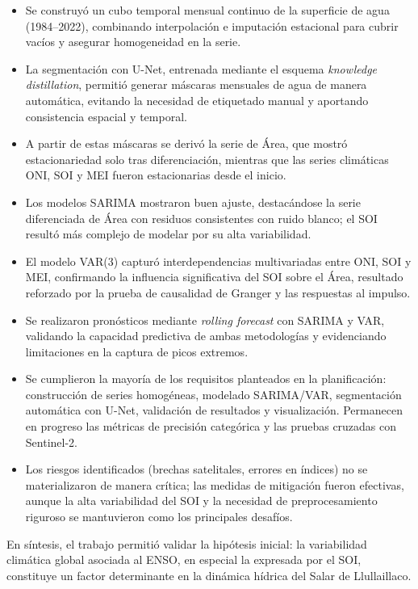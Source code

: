 \begin{itemize}
    \item Se construyó un cubo temporal mensual continuo de la superficie de agua (1984--2022), combinando interpolación e imputación estacional para cubrir vacíos y asegurar homogeneidad en la serie.
    \item La segmentación con U-Net, entrenada mediante el esquema \emph{knowledge distillation}, permitió generar máscaras mensuales de agua de manera automática, evitando la necesidad de etiquetado manual y aportando consistencia espacial y temporal.
    \item A partir de estas máscaras se derivó la serie de Área, que mostró estacionariedad solo tras diferenciación, mientras que las series climáticas ONI, SOI y MEI fueron estacionarias desde el inicio.
    \item Los modelos SARIMA mostraron buen ajuste, destacándose la serie diferenciada de Área con residuos consistentes con ruido blanco; el SOI resultó más complejo de modelar por su alta variabilidad.
    \item El modelo VAR(3) capturó interdependencias multivariadas entre ONI, SOI y MEI, confirmando la influencia significativa del SOI sobre el Área, resultado reforzado por la prueba de causalidad de Granger y las respuestas al impulso.
    \item Se realizaron pronósticos mediante \emph{rolling forecast} con SARIMA y VAR, validando la capacidad predictiva de ambas metodologías y evidenciando limitaciones en la captura de picos extremos.
    \item Se cumplieron la mayoría de los requisitos planteados en la planificación: construcción de series homogéneas, modelado SARIMA/VAR, segmentación automática con U-Net, validación de resultados y visualización. Permanecen en progreso las métricas de precisión categórica y las pruebas cruzadas con Sentinel-2.
    \item Los riesgos identificados (brechas satelitales, errores en índices) no se materializaron de manera crítica; las medidas de mitigación fueron efectivas, aunque la alta variabilidad del SOI y la necesidad de preprocesamiento riguroso se mantuvieron como los principales desafíos.
\end{itemize}


En síntesis, el trabajo permitió validar la hipótesis inicial: la variabilidad climática global asociada al ENSO, en especial la expresada por el SOI, constituye un factor determinante en la dinámica hídrica del Salar de Llullaillaco.

